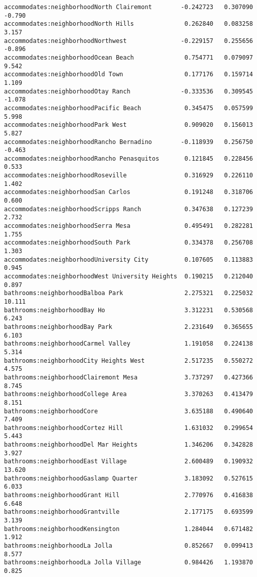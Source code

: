 \documentclass[
  letterpaper,
  krantz2]{style/krantz}
\begin{document}
\begin{verbatim}
accommodates:neighborhoodNorth Clairemont        -0.242723   0.307090  -0.790
accommodates:neighborhoodNorth Hills              0.262840   0.083258   3.157
accommodates:neighborhoodNorthwest               -0.229157   0.255656  -0.896
accommodates:neighborhoodOcean Beach              0.754771   0.079097   9.542
accommodates:neighborhoodOld Town                 0.177176   0.159714   1.109
accommodates:neighborhoodOtay Ranch              -0.333536   0.309545  -1.078
accommodates:neighborhoodPacific Beach            0.345475   0.057599   5.998
accommodates:neighborhoodPark West                0.909020   0.156013   5.827
accommodates:neighborhoodRancho Bernadino        -0.118939   0.256750  -0.463
accommodates:neighborhoodRancho Penasquitos       0.121845   0.228456   0.533
accommodates:neighborhoodRoseville                0.316929   0.226110   1.402
accommodates:neighborhoodSan Carlos               0.191248   0.318706   0.600
accommodates:neighborhoodScripps Ranch            0.347638   0.127239   2.732
accommodates:neighborhoodSerra Mesa               0.495491   0.282281   1.755
accommodates:neighborhoodSouth Park               0.334378   0.256708   1.303
accommodates:neighborhoodUniversity City          0.107605   0.113883   0.945
accommodates:neighborhoodWest University Heights  0.190215   0.212040   0.897
bathrooms:neighborhoodBalboa Park                 2.275321   0.225032  10.111
bathrooms:neighborhoodBay Ho                      3.312231   0.530568   6.243
bathrooms:neighborhoodBay Park                    2.231649   0.365655   6.103
bathrooms:neighborhoodCarmel Valley               1.191058   0.224138   5.314
bathrooms:neighborhoodCity Heights West           2.517235   0.550272   4.575
bathrooms:neighborhoodClairemont Mesa             3.737297   0.427366   8.745
bathrooms:neighborhoodCollege Area                3.370263   0.413479   8.151
bathrooms:neighborhoodCore                        3.635188   0.490640   7.409
bathrooms:neighborhoodCortez Hill                 1.631032   0.299654   5.443
bathrooms:neighborhoodDel Mar Heights             1.346206   0.342828   3.927
bathrooms:neighborhoodEast Village                2.600489   0.190932  13.620
bathrooms:neighborhoodGaslamp Quarter             3.183092   0.527615   6.033
bathrooms:neighborhoodGrant Hill                  2.770976   0.416838   6.648
bathrooms:neighborhoodGrantville                  2.177175   0.693599   3.139
bathrooms:neighborhoodKensington                  1.284044   0.671482   1.912
bathrooms:neighborhoodLa Jolla                    0.852667   0.099413   8.577
bathrooms:neighborhoodLa Jolla Village            0.984426   1.193870   0.825

\end{verbatim}
\end{document}
